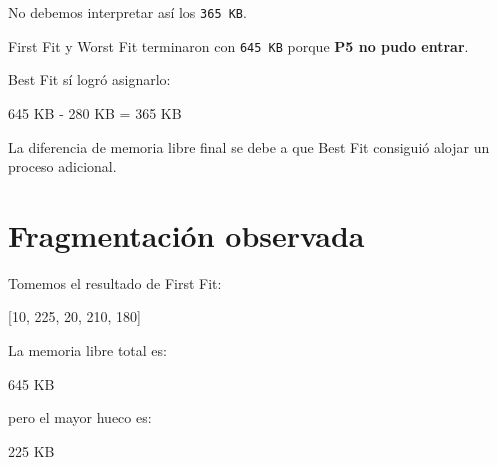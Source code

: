 \documentclass[
  spanish,
  letterpaper,
]{scrbook}
\newenvironment{Shaded}{\begin{snugshade}}{\end{snugshade}}
\newcommand{\NormalTok}[1]{\textcolor[rgb]{0.00,0.23,0.31}{#1}}
\begin{document}
\begin{tcolorbox}[enhanced jigsaw, arc=.35mm, bottomrule=.15mm, bottomtitle=1mm, breakable, colback=white, colbacktitle=quarto-callout-important-color!10!white, colframe=quarto-callout-important-color-frame, coltitle=black, left=2mm, leftrule=.75mm, opacityback=0, opacitybacktitle=0.6, rightrule=.15mm, title=\textcolor{quarto-callout-important-color}{\faExclamation}\hspace{0.5em}{¿Best Fit dejó menos memoria porque fue más eficiente?}, titlerule=0mm, toprule=.15mm, toptitle=1mm]

No debemos interpretar así los \texttt{365\ KB}.

First Fit y Worst Fit terminaron con \texttt{645\ KB} porque \textbf{P5
no pudo entrar}.

Best Fit sí logró asignarlo:

\begin{Shaded}
\begin{Highlighting}[]
\NormalTok{645 KB {-} 280 KB = 365 KB}
\end{Highlighting}
\end{Shaded}

La diferencia de memoria libre final se debe a que Best Fit consiguió
alojar un proceso adicional.

\end{tcolorbox}


\chapter{Fragmentación observada}\label{fragmentaciuxf3n-observada}

Tomemos el resultado de First Fit:

\begin{Shaded}
\begin{Highlighting}[]
\NormalTok{[10, 225, 20, 210, 180]}
\end{Highlighting}
\end{Shaded}

La memoria libre total es:

\begin{Shaded}
\begin{Highlighting}[]
\NormalTok{645 KB}
\end{Highlighting}
\end{Shaded}

pero el mayor hueco es:

\begin{Shaded}
\begin{Highlighting}[]
\NormalTok{225 KB}
\end{Highlighting}
\end{Shaded}
\end{document}
